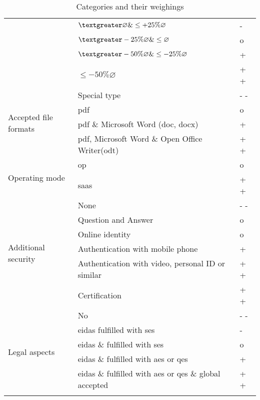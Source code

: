 \begin{longtable}{|p{4cm}|p{9cm}|p{1.5cm}|}
								& $ \textgreater \varnothing \& \leq +25\% \varnothing $ & - \\ \cline{2-3}
								& $ \textgreater -25\% \varnothing \& \leq \varnothing  $ & o \\ \cline{2-3}
								& $ \textgreater -50\% \varnothing \& \leq -25\% \varnothing $ & + \\ \cline{2-3}
								& $ \leq -50\% \varnothing $ & + + \\ \hline
		\multirow{4}{*}{Accepted file formats} & Special type & - - \\ \cline{2-3}
												& \Gls{pdf} & o \\ \cline{2-3}
												& \Gls{pdf} \& Microsoft Word (doc, docx) & + \\ \cline{2-3}
												& \Gls{pdf}, Microsoft Word \& Open Office Writer(odt) & + + \\ \hline
		\multirow{2}{*}{Operating mode} & \gls{op} & o \\ \cline{2-3}
										 & \gls{saas} & + + \\ \hline
		\multirow{6}{*}{Additional security} & None & - - \\ \cline{2-3}
											& Question and Answer & o \\ \cline{2-3} 
											& Online identity & o \\ \cline{2-3}
											& Authentication with mobile phone & + \\ \cline{2-3}
											& Authentication with video, personal ID or similar & + + \\ \cline{2-3}
											& Certification & + + \\ \hline
		\multirow{6}{*}{Legal aspects} & No & - - \\ \cline{2-3}
										& \gls{eidas} fulfilled with \gls{ses} & - \\ \cline{2-3}
										& \gls{eidas} \& \glossary{gdpr} fulfilled with \gls{ses} & o \\ \cline{2-3}
										& \gls{eidas} \& \glossary{gdpr} fulfilled with \gls{aes} or \gls{qes} & + \\ \cline{2-3}
										& \gls{eidas} \& \glossary{gdpr} fulfilled with \gls{aes} or \gls{qes} \& global accepted & + + \\ \hline
	\caption{Categories and their weighings}
	\label{tab:resTcateg}
	\end{longtable}
